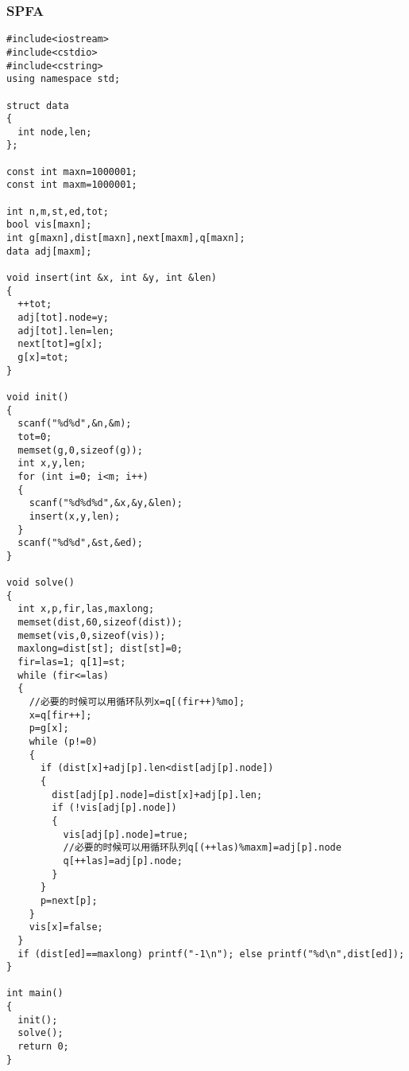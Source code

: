 \subsubsection{SPFA}
\begin{verbatim}
#include<iostream>
#include<cstdio>
#include<cstring>
using namespace std;

struct data
{
  int node,len;
};

const int maxn=1000001;
const int maxm=1000001;

int n,m,st,ed,tot;
bool vis[maxn];
int g[maxn],dist[maxn],next[maxm],q[maxn];
data adj[maxm];

void insert(int &x, int &y, int &len)
{
  ++tot;
  adj[tot].node=y;
  adj[tot].len=len;
  next[tot]=g[x];
  g[x]=tot;
}

void init()
{
  scanf("%d%d",&n,&m);
  tot=0;
  memset(g,0,sizeof(g));
  int x,y,len;
  for (int i=0; i<m; i++)
  {
    scanf("%d%d%d",&x,&y,&len);
    insert(x,y,len);
  }
  scanf("%d%d",&st,&ed);
}

void solve()
{
  int x,p,fir,las,maxlong;
  memset(dist,60,sizeof(dist));
  memset(vis,0,sizeof(vis));
  maxlong=dist[st]; dist[st]=0;
  fir=las=1; q[1]=st;
  while (fir<=las)
  {
    //必要的时候可以用循环队列x=q[(fir++)%mo];
    x=q[fir++];
    p=g[x];
    while (p!=0)
    {
      if (dist[x]+adj[p].len<dist[adj[p].node])
      {
        dist[adj[p].node]=dist[x]+adj[p].len;
        if (!vis[adj[p].node])
        {
          vis[adj[p].node]=true;
          //必要的时候可以用循环队列q[(++las)%maxm]=adj[p].node
          q[++las]=adj[p].node;
        }
      }
      p=next[p];
    }
    vis[x]=false;
  }
  if (dist[ed]==maxlong) printf("-1\n"); else printf("%d\n",dist[ed]);
}

int main()
{
  init();
  solve();
  return 0;
}

\end{verbatim}
